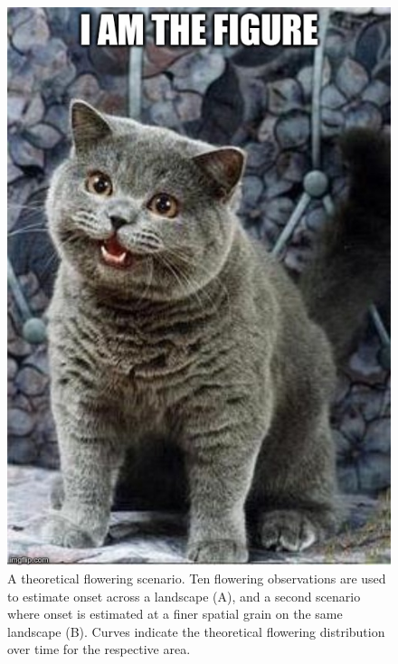 \begin{figure}
	\centering
		\includegraphics[scale=0.3]{images/figure_filler.jpg}
	\caption[A theoretical flowering scenario]{A theoretical flowering scenario. Ten flowering observations are used to estimate onset across a landscape (A), and a second scenario where onset is estimated at a finer spatial grain on the same landscape (B). Curves indicate the theoretical flowering distribution over time for the respective area.} \label{fig-3-5}
\end{figure}